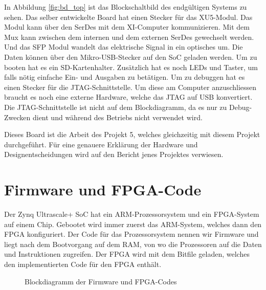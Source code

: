 \documentclass{article}
\begin{document}
In Abbildung \ref{fig:bd_top} ist das Blockschaltbild des endgültigen Systems zu sehen. Das selber entwickelte Board hat einen Stecker für das XU5-Modul. Das Modul kann über den SerDes mit dem XI-Computer kommunizieren. Mit dem Mux kann zwischen dem internen und dem externen SerDes gewechselt werden. Und das SFP Modul wandelt das elektrische Signal in ein optisches um. Die Daten können über den Mikro-USB-Stecker auf den SoC geladen werden. Um zu booten hat es ein SD-Kartenhalter. Zusätzlich hat es noch LEDs und Taster, um falls nötig einfache Ein- und Ausgaben zu betätigen. Um zu debuggen hat es einen Stecker für die JTAG-Schnittstelle. Um diese am Computer anzuschliessen braucht es noch eine externe Hardware, welche das JTAG auf USB konvertiert. Die JTAG-Schnittstelle ist nicht auf dem Blockdiagramm, da es nur zu Debug-Zwecken dient und während des Betriebs nicht verwendet wird. 

Dieses Board ist die Arbeit des Projekt 5, welches gleichzeitig mit diesem Projekt durchgeführt. Für eine genauere Erklärung der Hardware und Designentscheidungen wird auf den Bericht jenes Projektes verwiesen. 

\clearpage
\section{Firmware und FPGA-Code}

Der Zynq Ultrascale+ SoC hat ein ARM-Prozessorsystem und ein FPGA-System auf einem Chip. Gebootet wird immer zuerst das ARM-System, welches dann den FPGA konfiguriert. Der Code für das Prozessorsystem nennen wir Firmware und liegt nach dem Bootvorgang auf dem RAM, von wo die Prozessoren auf die Daten und Instruktionen zugreifen. Der FPGA wird mit dem Bitfile geladen, welches den implementierten Code für den FPGA enthält. 

\begin{figure}[tb]
    \caption{Blockdiagramm der Firmware und FPGA-Codes}
    \label{fig:bd_firmware}
\end{figure}
\end{document}
